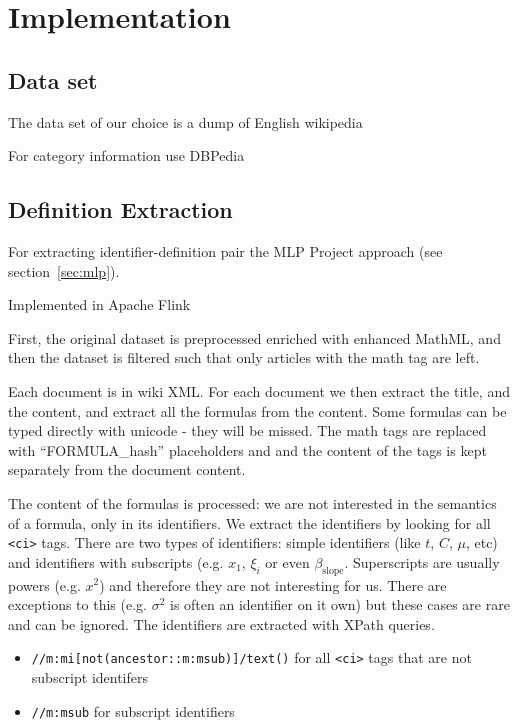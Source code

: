 \section{Implementation}

\subsection{Data set}
The data set of our choice is a dump of English wikipedia \cite{enwikidump}

For category information use DBPedia \cite{bizer2009dbpedia}

\subsection{Definition Extraction}


For extracting identifier-definition pair the MLP Project approach \cite{pagael2014mlp}
(see section~\ref{sec:mlp}).

Implemented in Apache Flink \cite{flink}

First, the original dataset is preprocessed enriched with enhanced MathML,
and then the dataset is filtered such that only articles with
the math tag are left.

Each document is in wiki XML. For each document we then extract the title,
and the content, and extract all the formulas from the content.
Some formulas can be typed directly with unicode - they will
be missed. The math tags are replaced with ``FORMULA\_hash'' placeholders and
and the content of the tags is kept separately from the document content.

The content of the formulas is processed: we are not interested in the
semantics of a formula, only in its identifiers. We extract the identifiers
by looking for all \verb|<ci>| tags. There are two types of identifiers:
simple identifiers (like $t$, $C$, $\mu$, etc) and identifiers with subscripts
(e.g. $x_1$, $\xi_i$ or even $\beta_{\text{slope}}$.
Superscripts are usually powers (e.g. $x^2$) and therefore they are not interesting
for us. There are exceptions to this (e.g. $\sigma^2$ is often an identifier on it
own) but these cases are rare and can be ignored.
The identifiers are extracted with XPath queries.

\begin{itemize}
  \item \verb|//m:mi[not(ancestor::m:msub)]/text()| for all \verb|<ci>| tags
that are not subscript identifers
  \item \verb|//m:msub| for subscript identifiers
\end{itemize}

